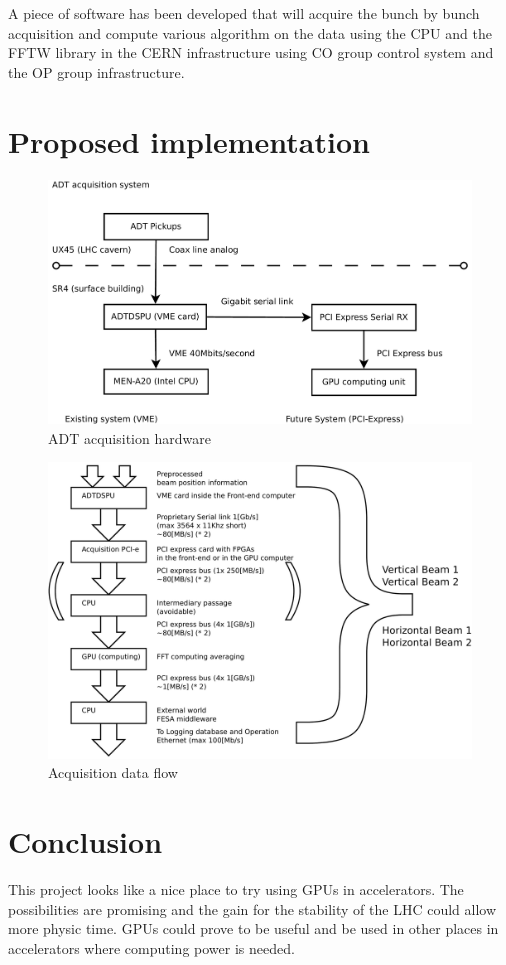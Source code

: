 \documentclass[a4paper]{article}
\begin{document}
A piece of software has been developed that will acquire the bunch by bunch 
acquisition and compute various algorithm on the data using the \gls{CPU} 
and the \gls{FFTW} library in the \gls{CERN} infrastructure using \gls{CO} 
group control system and the \gls{OP} group infrastructure.

\section{Proposed implementation}

\begin{figure}[H]
\caption{ADT acquisition hardware}
\includegraphics[scale=0.3]{acquisition.pdf}
\end{figure}

\begin{figure}[H]
\caption{Acquisition data flow}
\includegraphics[scale=0.3]{dataflow.pdf}
\end{figure}

\section{Conclusion}

This project looks like a nice place to try using \glspl{GPU} in accelerators.
The possibilities are promising and the gain for the stability of the 
\gls{LHC} could allow more physic time. \Glspl{GPU} could prove to be useful
and be used in other places in accelerators where computing power is needed.

\printglossaries

\clearpage



\end{document}
